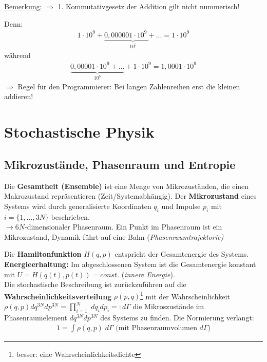 \documentclass[12pt]{article}
\begin{document}
\begin{enumerate}
\begin{enumerate}
\underline{Bemerkung:} $\Rightarrow $ 1. Kommutativgesetz der Addition gilt nicht nummerisch! 

Denn:
\begin{align*}
1 \cdot 10^9 + \underbrace{ 0,000001 \cdot 10^9 + ... }_{10^{5}} = 1 \cdot 10^9
\end{align*}
während
\begin{align*}
\underbrace{0,00001 \cdot 10^9 + ... }_{10^5} + 1 \cdot 10^9 = 1,0001 \cdot 10^9
\end{align*}
$\Rightarrow$ Regel für den Programmierer: Bei langen Zahlenreihen erst die kleinen addieren! 
\end{enumerate}
\end{enumerate}

\section{Stochastische Physik}

\subsection{Mikrozustände, Phasenraum und Entropie}
Die \textbf{Gesamtheit (Ensemble)} ist eine Menge von Mikrozuständen, die einen Makrozustand repräsentieren (Zeit/Systemabhängig). Der \textbf{Mikrozustand} eines Systems wird durch generalisierte Koordinaten $q_i$ und Impulse $p_i$ mit $i=\{ 1,...,3N\} $ beschrieben. \\
$\to 6N$-dimensionaler Phasenraum. Ein Punkt im Phasenraum ist ein Mikrozustand, Dynamik führt auf eine Bahn (\textit{Phasenraumtrajektorie)}

%

Die \textbf{Hamiltonfunktion} $H(q,p)$ entspricht der Gesamtenergie des Systems. \textbf{Energieerhaltung:} Im abgeschlossenen System ist die Gesamtenergie konstant mit $U = H (q (t), p(t)) = const.$ (\textit{innere Energie}). \\
Die stochastische Beschreibung ist zurückzuführen auf die \textbf{Wahrscheinlichkeitsverteilung} $\rho (p,q)$\footnote{ besser: eine Wahrscheinlichkeitsdichte} mit der Wahrscheinlichkeit $\rho (q,p) dq^{3N} dp	^{3N}= \prod_{i=1}^{N} \; dq_i dp_i =: d\Gamma $  die Mikroszustände im Phasenraumelement $dq^{3N} dp^{3N} $ des Systems zu finden. Die Normierung verlangt: 
\begin{align}
1 = \int \rho (q,p) \; d\Gamma \mbox{ (mit Phasenraumvolumen } d\Gamma)
\end{align}
\end{document}
